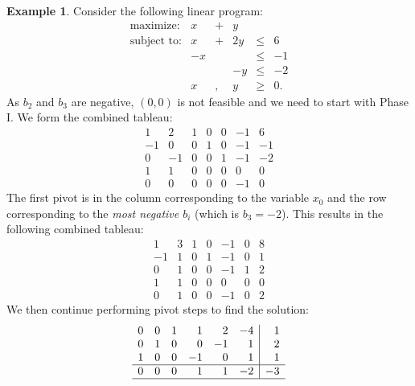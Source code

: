 \documentclass[
]{book}
\theoremstyle{definition}
\theoremstyle{definition}
\newtheorem{example}{Example}[chapter]
\theoremstyle{definition}
\theoremstyle{definition}
\theoremstyle{remark}
\begin{document}
\begin{example}
Consider the following linear program:
\begin{equation*}
  \begin{array}{rrrrrl}
  \mbox{maximize:} & x & + & y \\
  \mbox{subject to:}
    & x & + & 2y & \le & 6 \\
    & -x &  &  & \le & -1 \\ 
    &  &  & -y & \le & -2 \\ 
    & x & , & y & \ge & 0.
  \end{array}
\end{equation*}
As \(b_2\) and \(b_3\) are negative, \((0,0)\) is not feasible and we need to start with Phase I. We form the combined tableau:
\begin{equation*}
  \begin{array}{rrrrrr|r}
    1 & 2 & 1 & 0 & 0 & -1 & 6 \\
    -1 & 0 & 0 & 1 & 0 & -1 & -1 \\
    0 & -1 & 0 & 0 & 1 & \boxed{-1} & -2 \\ \hline
    1 & 1 & 0 & 0 & 0 & 0 & 0 \\ \hline
    0 & 0 & 0 & 0 & 0 & -1 & 0 
  \end{array}
\end{equation*}
The first pivot is in the column corresponding to the variable \(x_0\) and the row corresponding to the \emph{most negative \(b_i\)} (which is \(b_3 = -2\)). This results in the following combined tableau:
\begin{equation*}
  \begin{array}{rrrrrr|r}
    1 & 3 & 1 & 0 & -1 & 0 & 8 \\
    -1 & 1 & 0 & 1 & -1 & 0 & 1 \\
    0 & 1 & 0 & 0 & -1 & 1 & 2 \\ \hline
    1 & 1 & 0 & 0 & 0 & 0 & 0 \\ \hline
    0 & 1 & 0 & 0 & -1 & 0 & 2 
  \end{array}
\end{equation*}
We then continue performing pivot steps to find the solution:
\begin{equation*}
  \begin{array}{rrrrrr|r}
    0 & 0 & 1 & 1 & 2 & -4 & 1 \\
    0 & 1 & 0 & 0 & -1 & 1 & 2 \\
    1 & 0 & 0 & -1 & 0 & 1 & 1 \\ \hline
    0 & 0 & 0 & 1 & 1 & -2 & -3 \\ \hline

\end{array}
\end{equation*}
\end{example}
\end{document}
